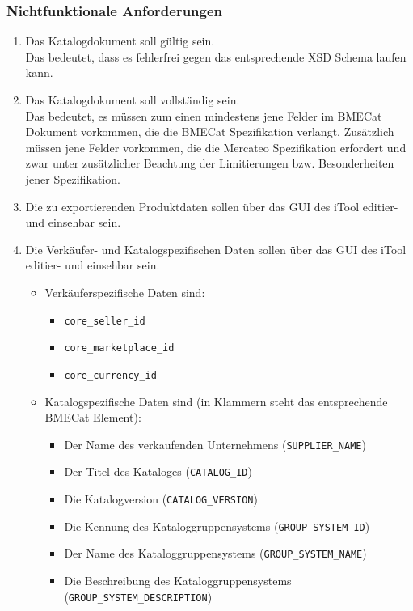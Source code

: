 		\subsubsection{Nichtfunktionale Anforderungen}
		\begin{enumerate}[noitemsep]
		\item Das Katalogdokument soll gültig sein.\\ Das bedeutet, dass es fehlerfrei gegen das entsprechende XSD Schema laufen kann.
		\item Das Katalogdokument soll vollständig sein. \\Das bedeutet, es müssen zum einen mindestens jene Felder im BMECat Dokument vorkommen, die die BMECat Spezifikation verlangt. Zusätzlich müssen jene Felder vorkommen, die die Mercateo Spezifikation erfordert und zwar unter zusätzlicher Beachtung der Limitierungen bzw. Besonderheiten jener Spezifikation. 	
		\item Die zu exportierenden Produktdaten sollen über das GUI des iTool editier- und einsehbar sein.
		\item Die Verkäufer- und Katalogspezifischen Daten sollen über das GUI des iTool editier- und einsehbar sein. 
			\begin{itemize}[noitemsep]
			\item Verkäuferspezifische Daten sind:
				\begin{itemize}[noitemsep]
					\item \texttt{core\_seller\_id}
					\item \texttt{core\_marketplace\_id} 
					\item \texttt{core\_currency\_id} 				
				\end{itemize}
			\item Katalogspezifische Daten sind (in Klammern steht das entsprechende BMECat Element):
				\begin{itemize}[noitemsep]
					\item Der Name des verkaufenden Unternehmens (\texttt{SUPPLIER\_NAME})
					\item Der Titel des Kataloges (\texttt{CATALOG\_ID})
					\item Die Katalogversion (\texttt{CATALOG\_VERSION})	
					\item Die Kennung des Kataloggruppensystems (\texttt{GROUP\_SYSTEM\_ID})	
					\item Der Name des Kataloggruppensystems (\texttt{GROUP\_SYSTEM\_NAME})	
					\item Die Beschreibung des Kataloggruppensystems (\texttt{GROUP\_SYSTEM\_DESCRIPTION})			

\end{itemize}
\end{itemize}
\end{enumerate}

